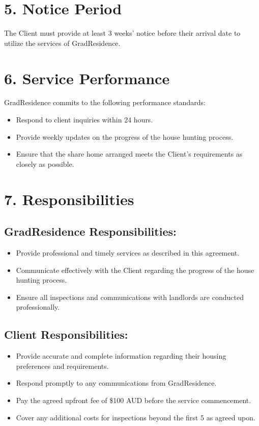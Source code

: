 \documentclass[a4paper,12pt]{article}
\begin{document}
\section*{5. Notice Period}
The Client must provide at least 3 weeks' notice before their arrival date to utilize the services of GradResidence.

\section*{6. Service Performance}
GradResidence commits to the following performance standards:
\begin{itemize}
    \item Respond to client inquiries within 24 hours.
    \item Provide weekly updates on the progress of the house hunting process.
    \item Ensure that the share home arranged meets the Client's requirements as closely as possible.
\end{itemize}

\section*{7. Responsibilities}
\subsection*{GradResidence Responsibilities:}
\begin{itemize}
    \item Provide professional and timely services as described in this agreement.
    \item Communicate effectively with the Client regarding the progress of the house hunting process.
    \item Ensure all inspections and communications with landlords are conducted professionally.
\end{itemize}

\subsection*{Client Responsibilities:}
\begin{itemize}
    \item Provide accurate and complete information regarding their housing preferences and requirements.
    \item Respond promptly to any communications from GradResidence.
    \item Pay the agreed upfront fee of \$100 AUD before the service commencement.
    \item Cover any additional costs for inspections beyond the first 5 as agreed upon.
\end{itemize}
\end{document}
